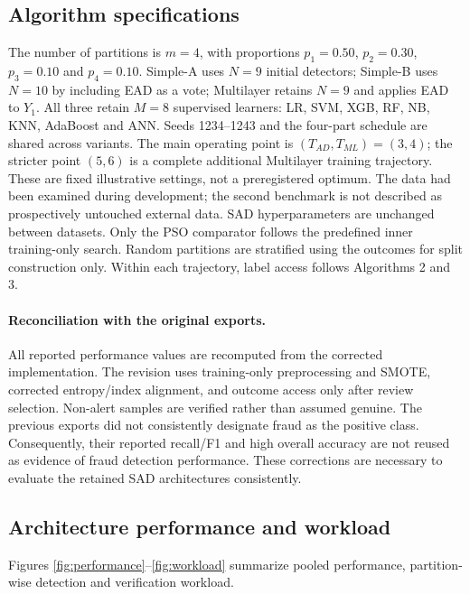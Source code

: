 \subsection{Algorithm specifications}\label{sec:specifications}
The number of partitions is $m=4$, with proportions
$p_1=0.50$, $p_2=0.30$, $p_3=0.10$ and $p_4=0.10$.
Simple-A uses $N=9$ initial detectors; Simple-B uses $N=10$ by including
EAD as a vote; Multilayer retains $N=9$ and applies EAD to $Y_1$.
All three retain $M=8$ supervised learners:
LR, SVM, XGB, RF, NB, KNN, AdaBoost and ANN.
Seeds 1234--1243 and the four-part schedule are shared across variants.
The main operating point is $(T_{AD},T_{ML})=(3,4)$; the stricter point $(5,6)$
is a complete additional Multilayer training trajectory.
These are fixed illustrative settings, not a preregistered optimum.
The data had been examined during development; the second benchmark is not
described as prospectively untouched external data.
SAD hyperparameters are unchanged between datasets.
Only the PSO comparator follows the predefined inner training-only search.
Random partitions are stratified using the outcomes for split construction
only. Within each trajectory, label access follows Algorithms 2 and 3.

\paragraph{Reconciliation with the original exports.}
All reported performance values are recomputed from the corrected
implementation. The revision uses training-only preprocessing and SMOTE, corrected
entropy/index alignment, and outcome access only after review selection.
Non-alert samples are verified rather than assumed genuine. The previous
exports did not consistently designate fraud as the positive class.
Consequently, their reported recall/F1 and high overall accuracy are not
reused as evidence of fraud detection performance. These corrections are
necessary to evaluate the retained SAD architectures consistently.

\FloatBarrier
\subsection{Architecture performance and workload}


Figures \ref{fig:performance}--\ref{fig:workload} summarize pooled performance,
partition-wise detection and verification workload.

